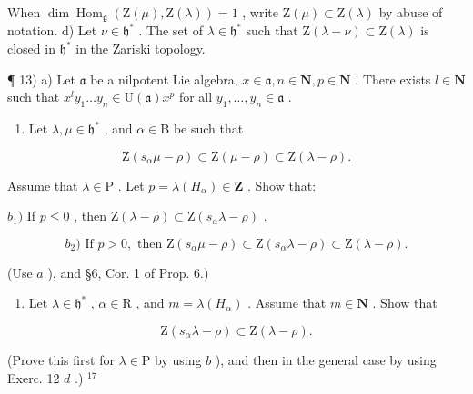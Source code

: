 When \(\dim\operatorname{Hom}_{\mathfrak{g}}(\mathrm{Z}(\mu),\mathrm{Z}(\lambda))=1\) , write \(\mathrm{Z}(\mu)\subset\mathrm{Z}(\lambda)\) by abuse of notation. d) Let \(\nu\in\mathfrak{h}^{*}\) . The set of \(\lambda\in\mathfrak{h}^{*}\) such that \(\mathrm{Z}(\lambda-\nu)\subset\mathrm{Z}(\lambda)\) is closed in \(\mathfrak{h}^{*}\) in the Zariski topology.

¶ 13) a) Let \(\mathfrak{a}\) be a nilpotent Lie algebra, \(x \in \mathfrak{a}, n \in \mathbf{N}, p \in \mathbf{N}\) . There exists \(l \in \mathbf{N}\) such that \(x^{l}y_{1} \ldots y_{n} \in \mathrm{U}(\mathfrak{a})x^{p}\) for all \(y_{1}, \ldots, y_{n} \in \mathfrak{a}\) .

\begin{enumerate}
\def\labelenumi{\alph{enumi})}
\setcounter{enumi}{1}
\tightlist
\item
  Let \(\lambda, \mu \in \mathfrak{h}^*\) , and \(\alpha \in \mathrm{B}\) be such that
\end{enumerate}

\[
\mathrm{Z} (s _ {\alpha} \mu - \rho) \subset \mathrm{Z} (\mu - \rho) \subset \mathrm{Z} (\lambda - \rho).
\]

Assume that \(\lambda \in \mathrm{P}\) . Let \(p = \lambda (H_{\alpha})\in \mathbf{Z}\) . Show that:

\(b_{1})\) If \(p \leq 0\) , then \(\mathrm{Z}(\lambda - \rho) \subset \mathrm{Z}(s_{\alpha}\lambda - \rho)\) .

\[
b _ {2}) \text {   If   } p > 0, \text {   then   } \mathrm{Z} (s _ {\alpha} \mu - \rho) \subset \mathrm{Z} (s _ {\alpha} \lambda - \rho) \subset \mathrm{Z} (\lambda - \rho).
\]

(Use \(a\) ), and §6, Cor. 1 of Prop. 6.)

\begin{enumerate}
\def\labelenumi{\alph{enumi})}
\setcounter{enumi}{2}
\tightlist
\item
  Let \(\lambda \in \mathfrak{h}^*\) , \(\alpha \in \mathrm{R}\) , and \(m = \lambda(H_{\alpha})\) . Assume that \(m \in \mathbf{N}\) . Show that
\end{enumerate}

\[
\mathrm{Z} (s _ {\alpha} \lambda - \rho) \subset \mathrm{Z} (\lambda - \rho).
\]

(Prove this first for \(\lambda \in \mathrm{P}\) by using \(b\) ), and then in the general case by using Exerc. 12 \(d\) .) \(^{17}\)

